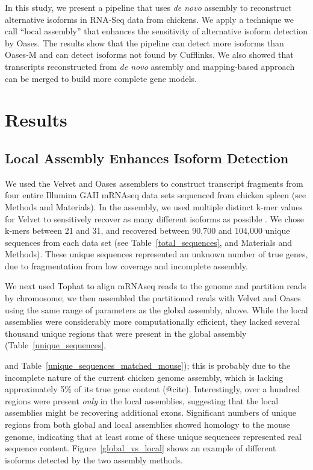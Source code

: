 \documentclass[10pt]{article}
\begin{document}
In this study, we present a pipeline that uses {\em de novo} assembly
to reconstruct alternative isoforms in RNA-Seq data from chickens.  We
apply a technique we call ``local assembly'' that enhances the sensitivity
of alternative isoform detection by Oases.  The results show that the
pipeline can detect more isoforms than Oases-M and can detect isoforms
not found by Cufflinks.  We also showed that transcripts reconstructed
from {\em de novo} assembly and mapping-based approach can be merged
to build more complete gene models.

\section*{Results}

\subsection*{Local Assembly Enhances Isoform Detection}

We used the Velvet\cite{Zerbino:2008vu} and Oases\cite{Schulz:2012je}
assemblers to construct transcript fragments from four entire Illumina
GAII mRNAseq data sets sequenced from chicken spleen (see Methods and
Materials).  In the assembly, we used multiple distinct k-mer values
for Velvet to sensitively recover as many different isoforms as possible
\cite{Schulz:2012je}.  We chose k-mers between 21 and 31,
and recovered between 90,700 and 104,000 unique sequences from
each data set (see Table~\ref{total_sequences}, and Materials and
Methods).  These unique sequences represented an unknown number of
true genes, due to fragmentation from low coverage and incomplete
assembly.

We next used Tophat to align mRNAseq reads to the genome and partition
reads by chromosome; we then assembled the partitioned reads with
Velvet and Oases using the same range of parameters as the global
assembly, above.  While the local assemblies were considerably more
computationally efficient, they lacked several thousand unique regions
that were present in the global assembly (Table~\ref{unique_sequences},


and Table~\ref{unique_sequences_matched_mouse}); this is probably due to the
incomplete nature of the current chicken genome assembly, which is lacking
approximately 5\% of its true gene content (@cite).  Interestingly, over a
hundred regions were present {\em only} in the local assemblies,
suggesting that the local assemblies might be recovering additional exons.
Significant numbers of unique regions from both global and local assemblies
showed homology to the mouse genome, indicating that at least some of these
unique sequences represented real sequence content.
Figure~\ref{global_vs_local} shows an example of different isoforms detected by
the two assembly methods.
\end{document}
